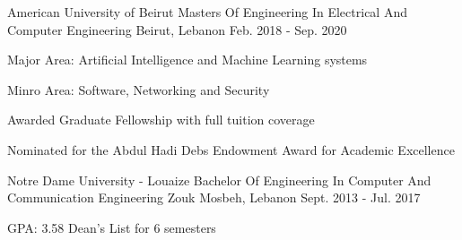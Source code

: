 

\begin{cventries}

  \cventry
    {American University of Beirut} %
    {Masters Of Engineering In Electrical And Computer Engineering} %
    {Beirut, Lebanon} %
    {Feb. 2018 - Sep. 2020} %
    {
      \begin{cvitems} %
        \item Major Area: Artificial Intelligence and Machine Learning systems
        \item Minro Area: Software, Networking and Security
        \item {Awarded Graduate Fellowship with full tuition coverage }
        \item {Nominated for the Abdul Hadi Debs Endowment Award for Academic Excellence}
      \end{cvitems}
    }

  \cventry
    {Notre Dame University - Louaize} %
    {Bachelor Of Engineering In Computer And Communication Engineering} %
    {Zouk Mosbeh, Lebanon} %
    {Sept. 2013 - Jul. 2017} %
    {
      \begin{cvitems} %
        \item {GPA: 3.58   Dean’s  List for 6 semesters}
      \end{cvitems}
    }




\end{cventries}
